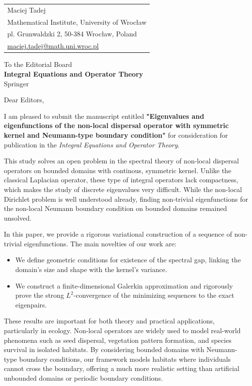 \documentclass[11pt, a4paper]{article}
\begin{document}
\noindent
\begin{tabular}{@{}l}
Maciej Tadej \\
Mathematical Institute, University of Wrocław \\
pl. Grunwaldzki 2, 50-384 Wrocław, Poland \\
\href{mailto:maciej.tadej@math.uni.wroc.pl}{maciej.tadej@math.uni.wroc.pl}
\end{tabular}

\vspace{2em}

\noindent
To the Editorial Board \\
\textbf{Integral Equations and Operator Theory} \\
Springer

\vspace{2em}

\noindent
Dear Editors,

\vspace{1em}

\noindent
I am pleased to submit the manuscript entitled \textbf{"Eigenvalues and eigenfunctions of the non-local dispersal operator with symmetric kernel and Neumann-type boundary condition"} for consideration for publication in the \textit{Integral Equations and Operator Theory}.

This study solves an open problem in the spectral theory of non-local dispersal operators on bounded domains with continous, symmetric kernel. Unlike the classical Laplacian operator, these type of integral operators lack compactness, which makes the study of discrete eigenvalues very difficult. While the non-local Dirichlet problem is well understood already, finding non-trivial eigenfunctions for the non-local Neumann boundary condition on bounded domains remained unsolved.

In this paper, we provide a rigorous variational construction of a sequence of non-trivial eigenfunctions. The main novelties of our work are:
\begin{itemize}
    \item We define geometric conditions for existence of the spectral gap, linking the domain's size and shape with the kernel's variance.
    \item We construct a finite-dimensional Galerkin approximation and rigorously prove the strong $L^2$-convergence of the minimizing sequences to the exact eigenpairs.
\end{itemize}

These results are important for both theory and practical applications, particularly in ecology. Non-local operators are widely used to model real-world phenomena such as seed dispersal, vegetation pattern formation, and species survival in isolated habitats. By considering bounded domains with Neumann-type boundary conditions, our framework models habitats where individuals cannot cross the boundary, offering a much more realistic setting than artificial unbounded domains or periodic boundary conditions.
\end{document}
